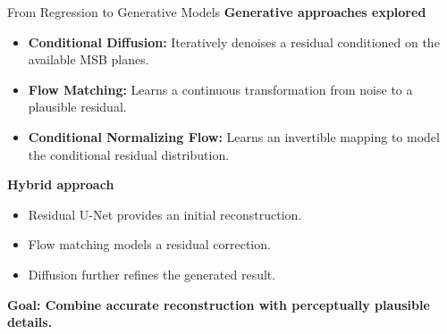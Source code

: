 \documentclass[aspectratio=169, 11pt]{beamer}
\begin{document}
\begin{frame}{From Regression to Generative Models}
\small
\textbf{Generative approaches explored}

\begin{itemize}
    \item \textbf{Conditional Diffusion:}
    Iteratively denoises a residual conditioned on the available MSB planes.

    \item \textbf{Flow Matching:}
    Learns a continuous transformation from noise to a plausible residual.

    \item \textbf{Conditional Normalizing Flow:}
    Learns an invertible mapping to model the conditional residual distribution.
\end{itemize}

\vspace{0.3cm}
\textbf{Hybrid approach}

\begin{itemize}
    \item Residual U-Net provides an initial reconstruction.
    \item Flow matching models a residual correction.
    \item Diffusion further refines the generated result.
\end{itemize}

\vspace{0.2cm}
\centering
\textbf{Goal: Combine accurate reconstruction with perceptually plausible details.}
\end{frame}
\end{document}
